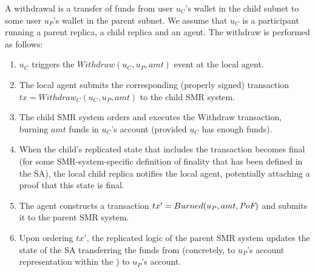 A withdrawal is a transfer of funds from user $u_C$'s wallet in the child subnet to some user $u_P$'s wallet in the parent subnet. We assume that $u_C$ is a participant running a parent replica, a child replica and an \ipc agent. The withdraw is performed as follows:
\begin{enumerate}
  \item $u_C$ triggers the $Withdraw(u_C, u_P, amt)$ event at the local \ipc agent.
    \item The local \ipc agent submits the corresponding (properly signed) transaction $tx = Withdraw_C(u_C, u_P, amt)$ to the child SMR system.
    \item The child SMR system orders and executes the Withdraw transaction, burning $amt$ funds in $u_C$'s account (provided $u_C$ has enough funds).
    \item When the child's replicated state that includes the transaction becomes final (for some SMR-system-specific definition of finality that has been defined in the SA), the local child replica notifies the local \ipc agent, potentially attaching a proof \prf that this state is final.%
    \item The \ipc agent constructs a transaction $tx' = Burned(u_P, amt, \textit{PoF})$ and submits it to the parent SMR system.
    \item Upon ordering $tx'$, the replicated logic of the parent SMR system updates the state of the SA transferring the funds from \sa (concretely, to $u_P$'s account representation within the \sa) to $u_P$'s account.
\end{enumerate}

